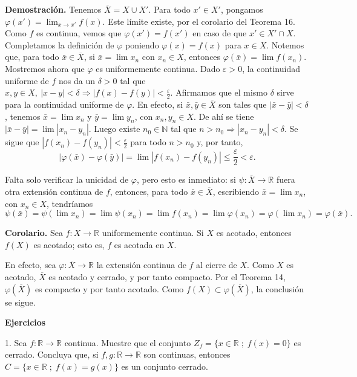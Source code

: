 \documentclass[12pt,oneside]{book}
\begin{document}
\textbf{Demostración.} Tenemos \(\overline{X} = X \cup X'\). Para todo \(x' \in X'\), pongamos \(\varphi(x') = \lim_{x \to x'} f(x)\). Este límite existe, por el corolario del Teorema 16. Como \(f\) es continua, vemos que \(\varphi(x') = f(x')\) en caso de que \(x' \in X' \cap X\). Completamos la definición de \(\varphi\) poniendo \(\varphi(x) = f(x)\) para \(x \in X\). Notemos que, para todo \(\bar{x} \in \overline{X}\), si \(\bar{x} = \lim x_n\) con \(x_n \in X\), entonces \(\varphi(\bar{x}) = \lim f(x_n)\). Mostremos ahora que \(\varphi\) es uniformemente continua. Dado \(\varepsilon > 0\), la continuidad uniforme de \(f\) nos da un \(\delta > 0\) tal que \(x, y \in X,\ |x - y| < \delta \Rightarrow |f(x) - f(y)| < \frac{\varepsilon}{2}\). Afirmamos que el mismo \(\delta\) sirve para la continuidad uniforme de \(\varphi\). En efecto, si \(\bar{x}, \bar{y} \in \overline{X}\) son tales que \(|\bar{x} - \bar{y}| < \delta\), tenemos \(\bar{x} = \lim x_n\) y \(\bar{y} = \lim y_n\), con \(x_n, y_n \in X\). De ahí se tiene \(|\bar{x} - \bar{y}| = \lim |x_n - y_n|\). Luego existe \(n_0 \in \mathbb{N}\) tal que \(n > n_0 \Rightarrow |x_n - y_n| < \delta\). Se sigue que \(|f(x_n) - f(y_n)| < \frac{\varepsilon}{2}\) para todo \(n > n_0\) y, por tanto,
\[
|\varphi(\bar{x}) - \varphi(\bar{y})| = \lim |f(x_n) - f(y_n)| \leq \frac{\varepsilon}{2} < \varepsilon.
\]

Falta solo verificar la unicidad de \(\varphi\), pero esto es inmediato: si \(\psi: \overline{X} \to \mathbb{R}\) fuera otra extensión continua de \(f\), entonces, para todo \(\bar{x} \in \overline{X}\), escribiendo \(\bar{x} = \lim x_n\), con \(x_n \in X\), tendríamos
\[
\psi(\bar{x}) = \psi(\lim x_n) = \lim \psi(x_n) = \lim f(x_n) = \lim \varphi(x_n) = \varphi(\lim x_n) = \varphi(\bar{x}).
\]

\textbf{Corolario.} Sea \(f: X \to \mathbb{R}\) uniformemente continua. Si \(X\) es acotado, entonces \(f(X)\) es acotado; esto es, \(f\) es acotada en \(X\).

En efecto, sea \(\varphi: \overline{X} \to \mathbb{R}\) la extensión continua de \(f\) al cierre de \(X\). Como \(X\) es acotado, \(\overline{X}\) es acotado y cerrado, y por tanto compacto. Por el Teorema 14, \(\varphi(\overline{X})\) es compacto y por tanto acotado. Como \(f(X) \subset \varphi(\overline{X})\), la conclusión se sigue.

\textbf{Ejercicios}

1. Sea \(f: \mathbb{R} \to \mathbb{R}\) continua. Muestre que el conjunto \(Z_f = \{x \in \mathbb{R} \; ; \; f(x) = 0\}\) es cerrado. Concluya que, si \(f, g: \mathbb{R} \to \mathbb{R}\) son continuas, entonces \(C = \{x \in \mathbb{R} \; ; \; f(x) = g(x)\}\) es un conjunto cerrado.
\end{document}
